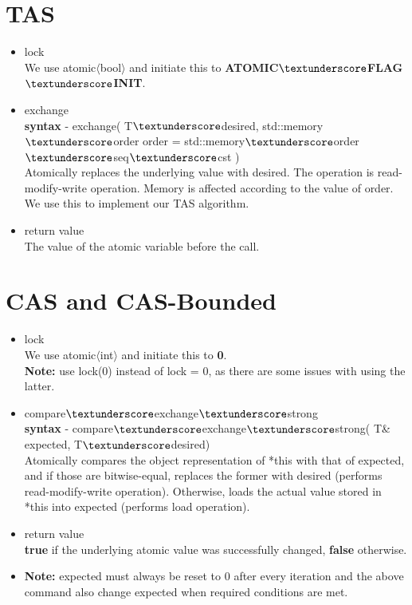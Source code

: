 \documentclass[12pt]{article}
\begin{document}
\section{TAS}
\begin{itemize}
\item lock\\
We use atomic$\langle$bool$\rangle$ and initiate this to \textbf{ATOMIC$\textunderscore$FLAG$\textunderscore$INIT}.
\item exchange\\
\textbf{syntax} - exchange( T$\textunderscore$desired, std::memory$\textunderscore$order order = std::memory$\textunderscore$order$\textunderscore$seq$\textunderscore$cst )\\
Atomically replaces the underlying value with desired. The operation is read-modify-write operation. Memory is affected according to the value of order.\\
We use this to implement our TAS algorithm.
\item return value\\
The value of the atomic variable before the call. 
\end{itemize}

\section{CAS and CAS-Bounded}
\begin{itemize}
\item lock\\
We use atomic$\langle$int$\rangle$ and initiate this to \textbf{0}.\\
\textbf{Note:} use lock(0) instead of lock = 0, as there are some issues with using the latter.
\item compare$\textunderscore$exchange$\textunderscore$strong\\
\textbf{syntax} - compare$\textunderscore$exchange$\textunderscore$strong( T\& expected, T$\textunderscore$desired)\\
Atomically compares the object representation of *this with that of expected, and if those are bitwise-equal, replaces the former with desired (performs read-modify-write operation). Otherwise, loads the actual value stored in *this into expected (performs load operation).
\item return value\\
\textbf{true} if the underlying atomic value was successfully changed, \textbf{false} otherwise.
\item \textbf{Note: }expected must always be reset to 0 after every iteration and the above command also change expected when required conditions are met.
\end{itemize}
\pagebreak
\end{document}
